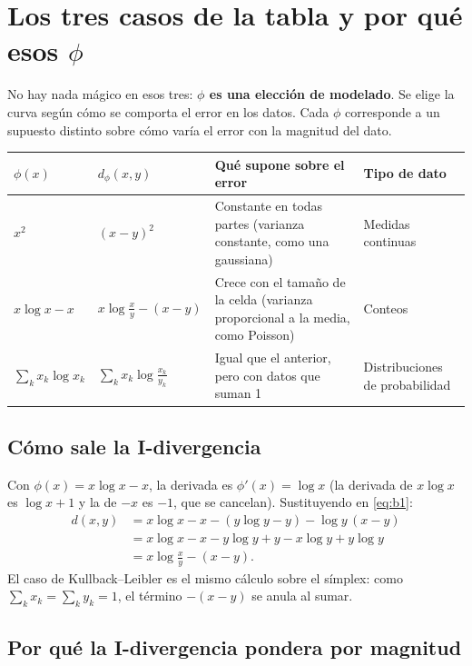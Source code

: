 \documentclass[11pt,a4paper]{article}
\begin{document}
\section{Los tres casos de la tabla y por qué esos $\phi$}

No hay nada mágico en esos tres: \textbf{$\phi$ es una elección de modelado}. Se
elige la curva según cómo se comporta el error en los datos. Cada $\phi$
corresponde a un supuesto distinto sobre cómo varía el error con la magnitud del
dato.

\begin{center}
\renewcommand{\arraystretch}{1.3}
\footnotesize
\begin{tabular}{@{}>{\raggedright\arraybackslash}p{2.6cm}>{\raggedright\arraybackslash}p{3.6cm}>{\raggedright\arraybackslash}p{5.6cm}>{\raggedright\arraybackslash}p{2.6cm}@{}}
\toprule
$\phi(x)$ & $d_\phi(x,y)$ & Qué supone sobre el error & Tipo de dato \\
\midrule
$x^2$ & $(x-y)^2$ & Constante en todas partes (varianza constante, como una gaussiana) & Medidas continuas \\
\midrule
$x\log x-x$ & $x\log\frac{x}{y}-(x-y)$ & Crece con el tamaño de la celda (varianza proporcional a la media, como Poisson) & Conteos \\
\midrule
$\sum_k x_k\log x_k$ & $\sum_k x_k\log\frac{x_k}{y_k}$ & Igual que el anterior, pero con datos que suman 1 & Distribuciones de probabilidad \\
\bottomrule
\end{tabular}
\end{center}

\subsection{Cómo sale la I-divergencia}

Con $\phi(x)=x\log x-x$, la derivada es $\phi'(x)=\log x$ (la derivada de
$x\log x$ es $\log x+1$ y la de $-x$ es $-1$, que se cancelan). Sustituyendo en
\eqref{eq:b1}:
\begin{align*}
  d(x,y)&=x\log x-x-(y\log y-y)-\log y\,(x-y)\\
        &=x\log x-x-y\log y+y-x\log y+y\log y\\
        &=x\log\frac{x}{y}-(x-y).
\end{align*}
El caso de Kullback--Leibler es el mismo cálculo sobre el símplex: como
$\sum_k x_k=\sum_k y_k=1$, el término $-(x-y)$ se anula al sumar.

\subsection{Por qué la I-divergencia pondera por magnitud}
\end{document}
